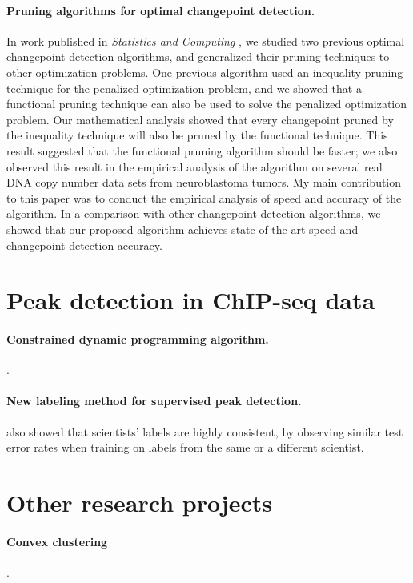 \documentclass{article}
\begin{document}
\paragraph{Pruning algorithms for optimal changepoint detection.} In
work published in \emph{Statistics and Computing} \citep{fpop}, we
studied two previous optimal changepoint detection algorithms, and
generalized their pruning techniques to other optimization
problems. One previous algorithm used an inequality pruning technique
for the penalized optimization problem, and we showed that a
functional pruning technique can also be used to solve the penalized
optimization problem. Our mathematical analysis showed that every
changepoint pruned by the inequality technique will also be pruned by
the functional technique. This result suggested that the functional
pruning algorithm should be faster; we also observed this result in
the empirical analysis of the algorithm on several real DNA copy
number data sets from neuroblastoma tumors. My main contribution to
this paper was to conduct the empirical analysis of speed and accuracy
of the algorithm. In a comparison with other changepoint detection
algorithms, we showed that our proposed algorithm achieves
state-of-the-art speed and changepoint detection
accuracy. 

\section{Peak detection in ChIP-seq data}

\paragraph{Constrained dynamic programming algorithm.} \citep{HOCKING-PeakSeg}.

\paragraph{New labeling method for supervised peak detection.}also
showed that scientists' labels are highly consistent, by observing
similar test error rates when training on labels from the same or a
different scientist.

\section{Other research projects}

\paragraph{Convex clustering} \citep{HOCKING-clusterpath}.
\end{document}
